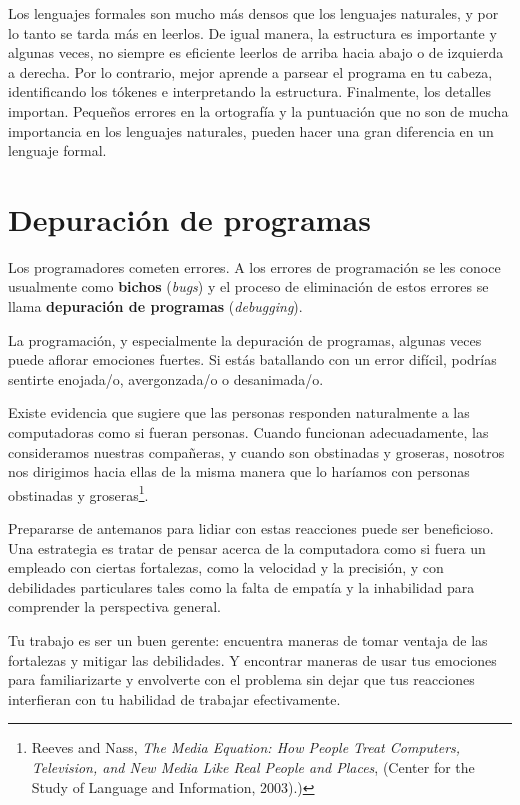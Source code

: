 Los lenguajes formales son mucho más densos que los lenguajes naturales,
y por lo tanto se tarda más en leerlos. De igual manera, la estructura
es importante y algunas veces, no siempre es eficiente leerlos de arriba
hacia abajo o de izquierda a derecha. Por lo contrario, mejor aprende
a parsear el programa en tu cabeza, identificando los tókenes e interpretando
la estructura. Finalmente, los detalles importan. Pequeños errores en 
la ortografía y la puntuación que no son de mucha importancia en los 
lenguajes naturales, pueden hacer una gran diferencia en un lenguaje formal.


\section{Depuración de programas}

Los programadores cometen errores. A los errores de programación 
se les conoce usualmente como {\bf bichos} ({\em bugs}) y el proceso 
de eliminación de estos errores se llama {\bf depuración de programas} 
({\em debugging}).

La programación, y especialmente la depuración de programas, algunas veces
puede aflorar emociones fuertes. Si estás batallando con un error difícil, podrías
sentirte enojada/o, avergonzada/o o desanimada/o.

Existe evidencia que sugiere que las personas responden naturalmente
a las computadoras como si fueran personas. Cuando funcionan adecuadamente,
las consideramos nuestras compañeras, y cuando son obstinadas y groseras, 
nosotros nos dirigimos hacia ellas de la misma manera que lo 
haríamos con personas obstinadas y groseras\footnote{Reeves and Nass, {\it The Media
    Equation: How People Treat Computers, Television, and New Media
    Like Real People and Places}, (Center for the Study of Language and Information, 2003).)}.

Prepararse de antemanos para lidiar con estas reacciones
puede ser beneficioso. Una estrategia es tratar de pensar acerca
de la computadora como si fuera un empleado con ciertas fortalezas,
como la velocidad y la precisión, y con debilidades particulares 
tales como la falta de empatía y la inhabilidad para comprender
la perspectiva general.

Tu trabajo es ser un buen gerente: encuentra maneras de tomar
ventaja de las fortalezas y mitigar las debilidades. Y encontrar maneras
de usar tus emociones para familiarizarte y envolverte con el problema
sin dejar que tus reacciones interfieran con tu habilidad de trabajar 
efectivamente. 

